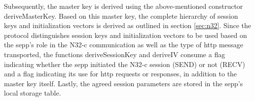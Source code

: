Subsequently, the master key is derived using the above-mentioned constructor {\sffamily deriveMasterKey}.
Based on this master key, the complete hierarchy of session keys and initialization vectors is derived as outlined in section \ref{sec:n32}.
Since the protocol distinguishes session keys and initialization vectors to be used based on the \gls{sepp}'s role in the N32-c communication as well as the type of \gls{http} message transported, the functions {\sffamily deriveSessionKey} and {\sffamily deriveIV} consume a flag indicating whether the \gls{sepp} initiated the N32-c session ({\sffamily SEND}) or not ({\sffamily RECV}) and a flag indicating its use for \gls{http} requests or responses, in addition to the master key itself.
Lastly, the agreed session parameters are stored in the \gls{sepp}'s local storage table.

